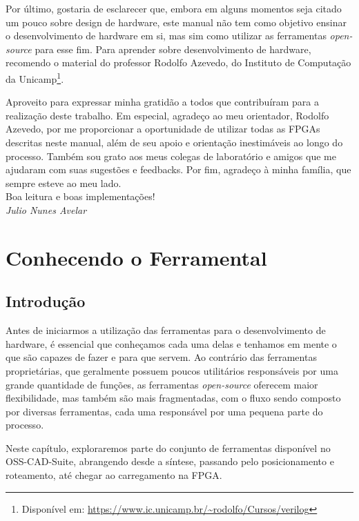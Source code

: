 \documentclass{report}
\begin{document}
Por último, gostaria de esclarecer que, embora em alguns momentos seja citado um pouco sobre design de hardware, este manual não tem como objetivo ensinar o desenvolvimento de hardware em si, mas sim como utilizar as ferramentas \textit{open-source} para esse fim. Para aprender sobre desenvolvimento de hardware, recomendo o material do professor Rodolfo Azevedo, do Instituto de Computação da Unicamp\footnote{Disponível em: \url{https://www.ic.unicamp.br/~rodolfo/Cursos/verilog}}.

Aproveito para expressar minha gratidão a todos que contribuíram para a realização deste trabalho. Em especial, agradeço ao meu orientador, Rodolfo Azevedo, por me proporcionar a oportunidade de utilizar todas as FPGAs descritas neste manual, além de seu apoio e orientação inestimáveis ao longo do processo. Também sou grato aos meus colegas de laboratório e amigos que me ajudaram com suas sugestões e feedbacks. Por fim, agradeço à minha família, que sempre esteve ao meu lado.\\

\noindent
Boa leitura e boas implementações!\\

\noindent
\textit{Julio Nunes Avelar}

\tableofcontents
\mainmatter  %
\chapter{Conhecendo o Ferramental}

\section{Introdução}

Antes de iniciarmos a utilização das ferramentas para o desenvolvimento de hardware, é essencial que conheçamos cada uma delas e tenhamos em mente o que são capazes de fazer e para que servem. Ao contrário das ferramentas proprietárias, que geralmente possuem poucos utilitários responsáveis por uma grande quantidade de funções, as ferramentas \textit{open-source} oferecem maior flexibilidade, mas também são mais fragmentadas, com o fluxo sendo composto por diversas ferramentas, cada uma responsável por uma pequena parte do processo.

Neste capítulo, exploraremos parte do conjunto de ferramentas disponível no OSS-CAD-Suite, abrangendo desde a síntese, passando pelo posicionamento e roteamento, até chegar ao carregamento na FPGA.
\end{document}
